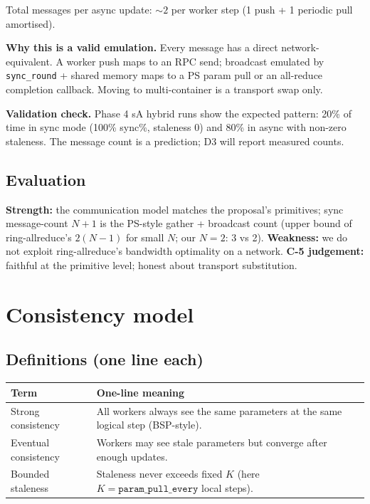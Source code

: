 \documentclass[11pt,a4paper]{article}
\begin{document}
\noindent Total messages per async update: ${\sim}2$ per worker step (1 push + 1 periodic pull amortised).

\noindent \textbf{Why this is a valid emulation.} Every message has a direct network-equivalent. A worker push maps to an RPC send; broadcast emulated by \texttt{sync\_round} + shared memory maps to a PS param pull or an all-reduce completion callback. Moving to multi-container is a transport swap only.

\noindent \textbf{Validation check.} Phase 4 sA hybrid runs show the expected pattern: 20\% of time in sync mode (100\% sync\%, staleness 0) and 80\% in async with non-zero staleness. The message count is a prediction; D3 will report measured counts.

\subsection{Evaluation}
\textbf{Strength:} the communication model matches the proposal's primitives; sync message-count $N+1$ is the PS-style gather + broadcast count (upper bound of ring-allreduce's $2(N-1)$ for small $N$; our $N=2$: 3 vs 2). \textbf{Weakness:} we do not exploit ring-allreduce's bandwidth optimality on a network. \textbf{C-5 judgement:} faithful at the primitive level; honest about transport substitution.

\section{Consistency model}

\subsection{Definitions (one line each)}

\begin{table}[htbp]
  \centering
  \begin{tabularx}{\linewidth}{@{}l L@{}}
    \toprule
    \textbf{Term} & \textbf{One-line meaning} \\
    \midrule
    Strong consistency & All workers always see the same parameters at the same logical step (BSP-style). \\
    Eventual consistency & Workers may see stale parameters but converge after enough updates. \\
    Bounded staleness & Staleness never exceeds fixed $K$ (here $K = \texttt{param\_pull\_every}$ local steps). \\
    \bottomrule
  \end{tabularx}
\end{table}
\end{document}
